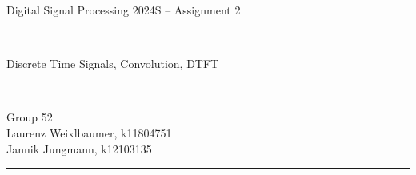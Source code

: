 \documentclass[12pt,a4paper,english]{article}
\begin{document}
\pagestyle{plain}

\thispagestyle{empty}
\noindent
\begin{minipage}[b][4cm]{1.0\textwidth}
    \begin{center}
        \begin{bf}
            \begin{large}
                Digital Signal Processing 2024S -- Assignment 2
            \end{large} \\
            \vspace{0.3cm}
            \begin{Large}
                Discrete Time Signals, Convolution, DTFT
            \end{Large} \\
            \vspace{0.3cm}
        \end{bf}
        \begin{large}
            Group 52\\
            Laurenz Weixlbaumer, k11804751\\
            Jannik Jungmann, k12103135\\
        \end{large}
    \end{center}
\end{minipage}

\noindent \rule[0.8em]{\textwidth}{0.12mm}\\[-0.5em]
\end{document}
